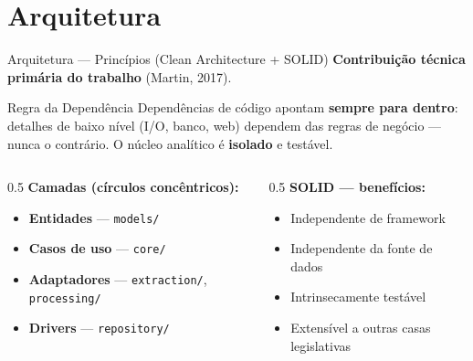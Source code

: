 \documentclass{beamer}
\begin{document}
\section{Arquitetura}

\begin{frame}{Arquitetura — Princípios (Clean Architecture + SOLID)}
\textbf{Contribuição técnica primária do trabalho} (Martin, 2017).

\vspace{0.3cm}
\begin{block}{Regra da Dependência}
Dependências de código apontam \textbf{sempre para dentro}: detalhes de baixo nível (I/O, banco, web) dependem das regras de negócio — nunca o contrário. O núcleo analítico é \textbf{isolado} e testável.
\end{block}

\begin{columns}
\begin{column}{0.5\textwidth}
\textbf{Camadas (círculos concêntricos):}
\begin{itemize}\footnotesize
  \item \textbf{Entidades} — \texttt{models/}
  \item \textbf{Casos de uso} — \texttt{core/}
  \item \textbf{Adaptadores} — \texttt{extraction/}, \texttt{processing/}
  \item \textbf{Drivers} — \texttt{repository/}
\end{itemize}
\end{column}
\begin{column}{0.5\textwidth}
\textbf{SOLID — benefícios:}
\begin{itemize}\footnotesize
  \item Independente de framework
  \item Independente da fonte de dados
  \item Intrinsecamente testável
  \item Extensível a outras casas legislativas
\end{itemize}
\end{column}
\end{columns}
\end{frame}
\end{document}
